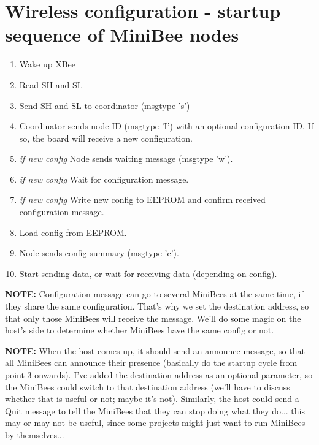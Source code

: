 \documentclass[letterpaper,10pt]{article}
\begin{document}
\section{Wireless configuration - startup sequence of MiniBee nodes}

\begin{enumerate}
 \item Wake up XBee
 \item Read SH and SL
 \item Send SH and SL to coordinator (msgtype 's')
 \item Coordinator sends node ID (msgtype 'I') with an optional configuration ID. If so, the board will receive a new configuration.
 \item \textit{if new config} Node sends waiting message (msgtype 'w').
 \item \textit{if new config} Wait for configuration message.
 \item \textit{if new config} Write new config to EEPROM and confirm received configuration message.
 \item Load config from EEPROM.
 \item Node sends config summary (msgtype 'c').
 \item Start sending data, or wait for receiving data (depending on config).
\end{enumerate}

\textbf{NOTE:} Configuration message can go to several MiniBees at the same time, if they share the same configuration. That's why we set the destination address, so that only those MiniBees will receive the message. We'll do some magic on the host's side to determine whether MiniBees have the same config or not.

\textbf{NOTE:} When the host comes up, it should send an announce message, so that all MiniBees can announce their presence (basically do the startup cycle from point 3 onwards). I've added the destination address as an optional parameter, so the MiniBees could switch to that destination address (we'll have to discuss whether that is useful or not; maybe it's not). Similarly, the host could send a Quit message to tell the MiniBees that they can stop doing what they do... this may or may not be useful, since some projects might just want to run MiniBees by themselves...
\end{document}
